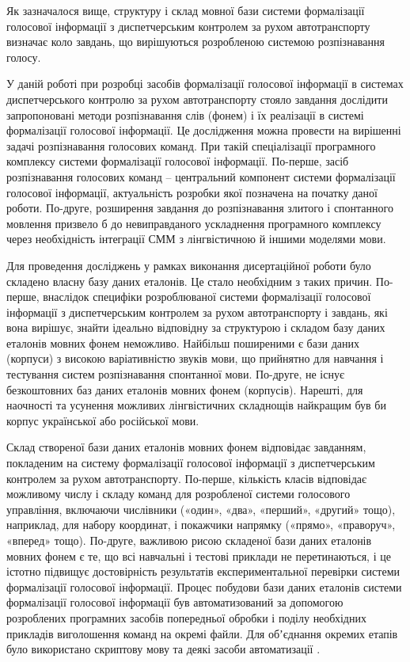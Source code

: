 Як зазначалося вище, структуру і склад мовної бази системи формалізації голосової інформації з диспетчерським контролем за рухом автотранспорту визначає коло завдань, що вирішуються розробленою системою розпізнавання голосу.

У даній роботі при розробці засобів формалізації голосової інформації в системах диспетчерського контролю за рухом автотранспорту стояло завдання дослідити запропоновані методи розпізнавання слів (фонем) і їх реалізації в системі формалізації голосової інформації. Це дослідження можна провести на вирішенні задачі розпізнавання голосових команд. При такій спеціалізації програмного комплексу системи формалізації голосової інформації. По-перше, засіб розпізнавання голосових команд – центральний компонент системи формалізації голосової інформації, актуальність розробки якої позначена на початку даної роботи. По-друге, розширення завдання до розпізнавання злитого і спонтанного мовлення призвело б до невиправданого ускладнення програмного комплексу через необхідність інтеграції СММ з лінгвістичною й іншими моделями мови.

Для проведення досліджень у рамках виконання дисертаційної роботи було складено власну базу даних еталонів. Це стало необхідним з таких причин. По-перше, внаслідок специфіки розроблюваної системи формалізації голосової інформації з диспетчерським контролем за рухом автотранспорту і завдань, які вона вирішує, знайти ідеально відповідну за структурою і складом базу даних еталонів мовних фонем неможливо. Найбільш поширеними є бази даних (корпуси) з високою варіативністю звуків мови, що прийнятно для навчання і тестування систем розпізнавання спонтанної мови. По-друге, не існує безкоштовних баз даних еталонів мовних фонем (корпусів). Нарешті, для наочності та усунення можливих лінгвістичних складнощів найкращим був би корпус української або російської мови.

Склад створеної бази даних еталонів мовних фонем відповідає завданням, покладеним на систему формалізації голосової інформації з диспетчерським контролем за рухом автотранспорту. По-перше, кількість класів відповідає можливому числу і складу команд для розробленої системи голосового управління, включаючи числівники («один», «два», «перший», «другий» тощо), наприклад, для набору координат, і покажчики напрямку («прямо», «праворуч», «вперед» тощо). По-друге, важливою рисою складеної бази даних еталонів мовних фонем є те, що всі навчальні і тестові приклади не перетинаються, і це  істотно підвищує достовірність результатів експериментальної перевірки системи формалізації голосової інформації. Процес побудови бази даних еталонів системи формалізації голосової інформації був автоматизований за допомогою розроблених програмних засобів попередньої обробки і поділу необхідних прикладів виголошення команд на окремі файли. Для обʼєднання окремих етапів було використано скриптову мову та деякі засоби автоматизації \cite{tange_ole_2018_1146014}.

